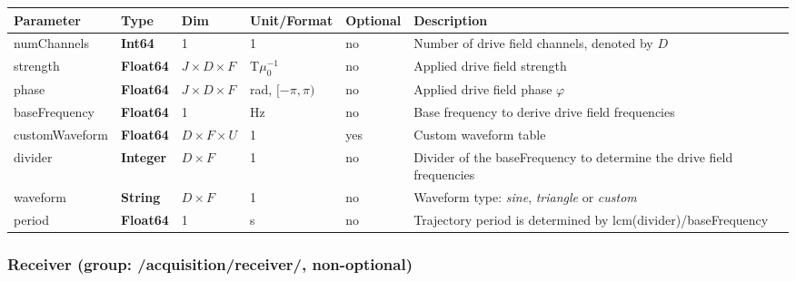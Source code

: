 \documentclass[landscape,a4paper]{article} %
\newcommand{\inltab}[1]{{\ttfamily\bfseries\color{blue}#1}}
\newcommand{\inlvar}[1]{{\ttfamily#1}}
\begin{document}
\noindent \begin{tabularx}{\columnwidth}{lllllX} 
\textbf{Parameter} & \textbf{Type} & \textbf{Dim} & \textbf{Unit/Format} & \textbf{Optional} & \textbf{Description} \\ \hline 
\inlvar{numChannels} & \inltab{Int64} & 1 & 1 & no & Number of drive field channels, denoted by $D$ \\ \hline
\inlvar{strength} & \inltab{Float64} & $J \times D \times F $ & T$\mu_0^{-1}$ & no & Applied drive field strength \\ \hline
\inlvar{phase} & \inltab{Float64} & $J \times D \times F$ & rad, $[-\pi,\pi)$ & no & Applied drive field phase $\varphi$\\ \hline
\inlvar{baseFrequency} & \inltab{Float64} & 1 & Hz & no & Base frequency to derive drive field frequencies \\ \hline
\inlvar{customWaveform} & \inltab{Float64} & $D \times F \times U$ & 1 & yes & Custom waveform table \\ \hline
\inlvar{divider} & \inltab{Integer} & $D \times F$ & 1 & no & Divider of the \inlvar{baseFrequency} to determine the drive field frequencies \\ \hline
\inlvar{waveform} & \inltab{String} & $D \times F$ & 1 & no & Waveform type: \textit{sine}, \textit{triangle} or \textit{custom} \\ \hline
\inlvar{period} & \inltab{Float64} & 1 & s & no & Trajectory period is determined by lcm(\inlvar{divider})/\inlvar{baseFrequency}\\ \hline
\end{tabularx}


\subsubsection{Receiver (group: \inlvar{/acquisition/receiver/}, non-optional)}
\end{document}

